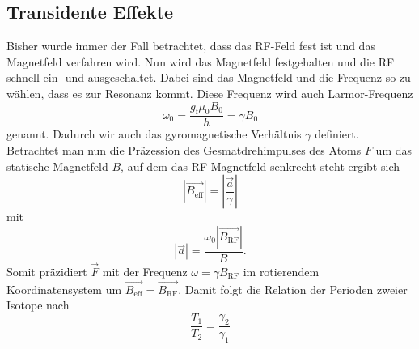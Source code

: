 \subsection{Transidente Effekte}
\label{sec:transident}
Bisher wurde immer der Fall betrachtet, dass das RF-Feld fest ist und das Magnetfeld verfahren wird. Nun wird
das Magnetfeld festgehalten und die RF schnell ein- und ausgeschaltet. Dabei sind das Magnetfeld und die Frequenz
so zu wählen, dass es zur Resonanz kommt. Diese Frequenz wird auch Larmor-Frequenz
\begin{equation}
  \label{eqn:larmor}
  \omega_0 = \frac{g_\text{f} \mu_0 B_0}{h} = \gamma B_0
\end{equation}
genannt. Dadurch wir auch das gyromagnetische Verhältnis $\gamma$ definiert.
Betrachtet man nun die Präzession des Gesmatdrehimpulses des Atoms $F$ um das statische Magnetfeld $B$, auf dem das RF-Magnetfeld senkrecht steht 
ergibt sich 
\begin{equation*}
  |\vec{B_\text{eff}}| = \left|\frac{\vec{a}}{\gamma}\right|
\end{equation*}
mit 
\begin{equation*}
  |\vec{a}| = \frac{\omega_0 |\vec{B_\text{RF}}|}{B}.
\end{equation*}
Somit präzidiert $\vec{F}$ mit der Frequenz $\omega = \gamma B_\text{RF}$ im rotierendem Koordinatensystem um
$\vec{B_\text{eff}} = \vec{B_\text{RF}}$. Damit folgt die Relation der Perioden zweier Isotope nach
\begin{equation*}
  \frac{T_1}{T_2} = \frac{\gamma_2}{\gamma_1}
\end{equation*}

\FloatBarrier


